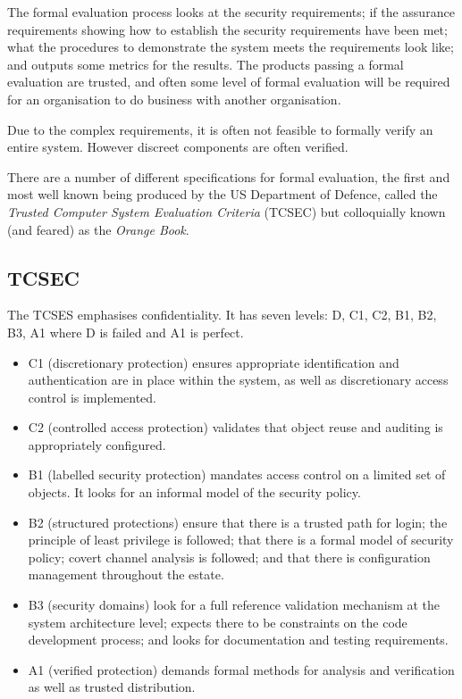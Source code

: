 The formal evaluation process looks at the security requirements; if the assurance requirements showing how to establish the security requirements have been met; what the procedures to demonstrate the system meets the requirements look like; and outputs some metrics for the results. The products passing a formal evaluation are trusted, and often some level of formal evaluation will be required for an organisation to do business with another organisation. 

Due to the complex requirements, it is often not feasible to formally verify an entire system. However discreet components are often verified. 

There are a number of different specifications for formal evaluation, the first and most well known being produced by the US Department of Defence, called the \textit{Trusted Computer System Evaluation Criteria} (TCSEC) but colloquially known (and feared) as the \textit{Orange Book}. 

\subsection{TCSEC}
The TCSES emphasises confidentiality. It has seven levels: D, C1, C2, B1, B2, B3, A1 where D is failed and A1 is perfect.

\begin{itemize}
    \item C1 (discretionary protection) ensures appropriate identification and authentication are in place within the system, as well as discretionary access control is implemented. 
    \item C2 (controlled access protection) validates that object reuse and auditing is appropriately configured. 
    \item B1 (labelled security protection) mandates access control on a limited set of objects. It looks for an informal model of the security policy.
    \item B2 (structured protections) ensure that there is a trusted path for login; the principle of least privilege is followed; that there is a formal model of security policy; covert channel analysis is followed; and that there is configuration management throughout the estate.
    \item B3 (security domains) look for a full reference validation mechanism at the system architecture level; expects there to be constraints on the code development process; and looks for documentation and testing requirements.
    \item A1 (verified protection) demands formal methods for analysis and verification as well as trusted distribution. 
\end{itemize}

